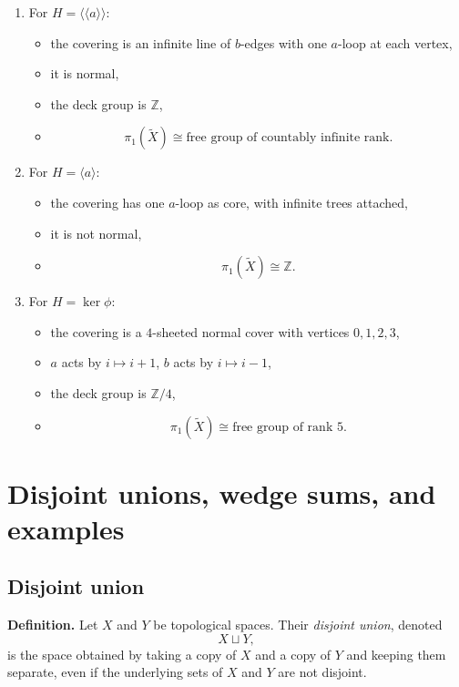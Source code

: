 \documentclass[12pt,a4paper]{article}
\theoremstyle{notespace}
\begin{document}
\begin{enumerate}
	\item[(i)] For \(H=\langle\!\langle a\rangle\!\rangle\):
	\begin{itemize}
		\item the covering is an infinite line of \(b\)-edges with one \(a\)-loop at each vertex,
		\item it is normal,
		\item the deck group is \(\mathbb Z\),
		\item
		\[
		\pi_1(\widetilde X)\cong \text{free group of countably infinite rank}.
		\]
	\end{itemize}
	
	\item[(ii)] For \(H=\langle a\rangle\):
	\begin{itemize}
		\item the covering has one \(a\)-loop as core, with infinite trees attached,
		\item it is not normal,
		\item
		\[
		\pi_1(\widetilde X)\cong \mathbb Z.
		\]
	\end{itemize}
	
	\item[(iii)] For \(H=\ker\phi\):
	\begin{itemize}
		\item the covering is a \(4\)-sheeted normal cover with vertices \(0,1,2,3\),
		\item \(a\) acts by \(i\mapsto i+1\), \(b\) acts by \(i\mapsto i-1\),
		\item the deck group is \(\mathbb Z/4\),
		\item
		\[
		\pi_1(\widetilde X)\cong \text{free group of rank }5.
		\]
	\end{itemize}
\end{enumerate}

\section{Disjoint unions, wedge sums, and examples}

\subsection{Disjoint union}

\textbf{Definition.}
Let \(X\) and \(Y\) be topological spaces. Their \emph{disjoint union}, denoted
\[
X\sqcup Y,
\]
is the space obtained by taking a copy of \(X\) and a copy of \(Y\) and keeping them separate, even if the underlying sets of \(X\) and \(Y\) are not disjoint.
\end{document}
